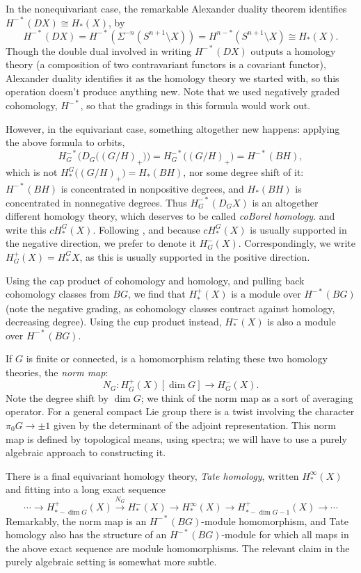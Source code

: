 \documentclass{memo-l}
\theoremstyle{definition}
\theoremstyle{remark}
\numberwithin{section}{chapter}
\numberwithin{equation}{chapter}
\begin{document}
In the nonequivariant case, the remarkable Alexander duality theorem identifies $H^{-*}(DX) \cong H_*(X)$, by $$H^{-*}(DX) = H^{-*}\left(\Sigma^{-n}(S^{n+1} \setminus X)\right) = H^{n-*}(S^{n+1} \setminus X) \cong H_*(X).$$
Though the double dual involved in writing $H^{-*}(DX)$ outputs a homology theory (a composition of two contravariant functors is a covariant functor), Alexander duality identifies it as the homology theory we started with, so this operation doesn't produce anything new. Note that we used negatively graded cohomology, $H^{-*}$, so that the gradings in this formula would work out.

However, in the equivariant case, something altogether new happens: applying the above formula to orbits, $$H^{-*}_G\Big(D_G\big((G/H)_+\big)\Big) = H^{-*}_G\big((G/H)_+\big) = H^{-*}(BH),$$ which is not $H_*^G\big((G/H)_+\big) = H_*(BH)$, nor some degree shift of it: $H^{-*}(BH)$ is concentrated in nonpositive degrees, and $H_*(BH)$ is concentrated in nonnegative degrees. Thus $H^{-*}_G(D_GX)$ is an altogether different homology theory, which deserves to be called \emph{coBorel homology}. \cite{GreM} and \cite{Man} write this $cH^G_*(X)$. Following \cite{Jones}, and because $cH^G_*(X)$ is usually supported in the negative direction, we prefer to denote it $H^-_G(X)$. Correspondingly, we write $H^+_G(X) = H^G_*X$, as this is usually supported in the positive direction.

Using the cap product of cohomology and homology, and pulling back cohomology classes from $BG$, we find that $H^+_*(X)$ is a module over $H^{-*}(BG)$ (note the negative grading, as cohomology classes contract against homology, decreasing degree). Using the cup product instead, $H^-_*(X)$ is also a module over $H^{-*}(BG)$.

If $G$ is finite or connected, is a homomorphism relating these two homology theories, the \emph{norm map}: 
$$N_G: H^+_G(X)[\dim G] \to H^-_G(X).$$
Note the degree shift by $\dim G$; we think of the norm map as a sort of averaging operator. For a general compact Lie group there is a twist involving the character $\pi_0 G \to \pm 1$ given by the determinant of the adjoint representation. This norm map is defined by topological means, using spectra; we will have to use a purely algebraic approach to constructing it.

There is a final equivariant homology theory, \emph{Tate homology}, written $H^\infty_*(X)$ and fitting into a long exact sequence $$\cdots \to H^+_{*- \dim G}(X) \xrightarrow{N_G} H^-_{*}(X) \to H^\infty_{*}(X) \to H^+_{*-\dim G -1}(X) \to \cdots$$ Remarkably, the norm map is an $H^{-*}(BG)$-module homomorphism, and Tate homology also has the structure of an $H^{-*}(BG)$-module for which all maps in the above exact sequence are module homomorphisms. The relevant claim in the purely algebraic setting is somewhat more subtle.%
\end{document}
